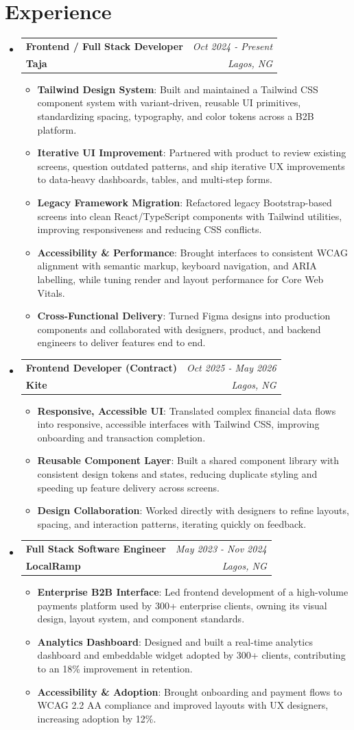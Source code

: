 \documentclass[a4paper]{article}
\makeatletter
\newcommand{\resumeItem}[2]{ \item\small{ \textbf{#1}: #2 } }
\newcommand{\resumeJobHeading}[4]{ %
\vspace{2pt}
\item[]
\begin{tabular*}{0.97\textwidth}{l@{\extracolsep{\fill}}r}
	\textbf{#1} & \textit{#3} \\
	\textbf{#4} & \textit{#2} \\
\end{tabular*}
\vspace{0pt}
}
\newcommand{\resumeSubHeadingListStart}{\begin{itemize}[leftmargin=*,topsep=1pt]}
\newcommand{\resumeSubHeadingListEnd}{\end{itemize}}
\newcommand{\resumeItemListStart}{\begin{itemize}[topsep=0pt,itemsep=0pt,parsep=0pt]}
\newcommand{\resumeItemListEnd}{\end{itemize}}
\makeatother
\begin{document}
	\vspace{4pt}
	\section{Experience}
	\resumeSubHeadingListStart
	\resumeJobHeading{Frontend / Full Stack Developer}{Lagos, NG}{Oct 2024 - Present}{Taja}
	\resumeItemListStart
	\resumeItem{Tailwind Design System}
	{Built and maintained a Tailwind CSS component system with variant-driven, reusable UI primitives, standardizing spacing, typography, and color tokens across a B2B platform.}
	\resumeItem{Iterative UI Improvement}
	{Partnered with product to review existing screens, question outdated patterns, and ship iterative UX improvements to data-heavy dashboards, tables, and multi-step forms.}
	\resumeItem{Legacy Framework Migration}
	{Refactored legacy Bootstrap-based screens into clean React/TypeScript components with Tailwind utilities, improving responsiveness and reducing CSS conflicts.}
	\resumeItem{Accessibility \& Performance}
	{Brought interfaces to consistent WCAG alignment with semantic markup, keyboard navigation, and ARIA labelling, while tuning render and layout performance for Core Web Vitals.}
	\resumeItem{Cross-Functional Delivery}
	{Turned Figma designs into production components and collaborated with designers, product, and backend engineers to deliver features end to end.}
	\resumeItemListEnd

	\resumeJobHeading{Frontend Developer (Contract)}{Lagos, NG}{Oct 2025 - May 2026}{Kite}
	\resumeItemListStart
	\resumeItem{Responsive, Accessible UI}
	{Translated complex financial data flows into responsive, accessible interfaces with Tailwind CSS, improving onboarding and transaction completion.}
	\resumeItem{Reusable Component Layer}
	{Built a shared component library with consistent design tokens and states, reducing duplicate styling and speeding up feature delivery across screens.}
	\resumeItem{Design Collaboration}
	{Worked directly with designers to refine layouts, spacing, and interaction patterns, iterating quickly on feedback.}
	\resumeItemListEnd

	\resumeJobHeading{Full Stack Software Engineer}{Lagos, NG}{May 2023 - Nov 2024}{LocalRamp}
	\resumeItemListStart
	\resumeItem{Enterprise B2B Interface}
	{Led frontend development of a high-volume payments platform used by 300+ enterprise clients, owning its visual design, layout system, and component standards.}
	\resumeItem{Analytics Dashboard}
	{Designed and built a real-time analytics dashboard and embeddable widget adopted by 300+ clients, contributing to an 18\% improvement in retention.}
	\resumeItem{Accessibility \& Adoption}
	{Brought onboarding and payment flows to WCAG 2.2 AA compliance and improved layouts with UX designers, increasing adoption by 12\%.}
	\resumeItemListEnd
	\resumeSubHeadingListEnd
\end{document}

